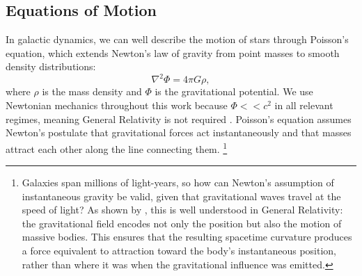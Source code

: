     
    \subsection{Equations of Motion} \label{subsec:myEquationsOfMotion}

        In galactic dynamics, we can well describe the motion of stars through Poisson's equation, which extends Newton's law of gravity from point masses to smooth density distributions: 
        \begin{equation} \label{eq:poissonsequation}
            \nabla^2 \Phi = 4\pi G \rho,
        \end{equation}
        where $\rho$ is the mass density and $\Phi$ is the gravitational potential. We use Newtonian mechanics throughout this work because $\Phi << c^2$ in all relevant regimes, meaning General Relativity is not required \citep[see Appendix C of][]{bovy_inprep}. Poisson's equation assumes Newton's postulate that gravitational forces act instantaneously and that masses attract each other along the line connecting them. \footnote{Galaxies span millions of light-years, so how can Newton's assumption of instantaneous gravity be valid, given that gravitational waves travel at the speed of light? As shown by \citet{2000PhLA..267...81C}, this is well understood in General Relativity: the gravitational field encodes not only the position but also the motion of massive bodies. This ensures that the resulting spacetime curvature produces a force equivalent to attraction toward the body's instantaneous position, rather than where it was when the gravitational influence was emitted.}

